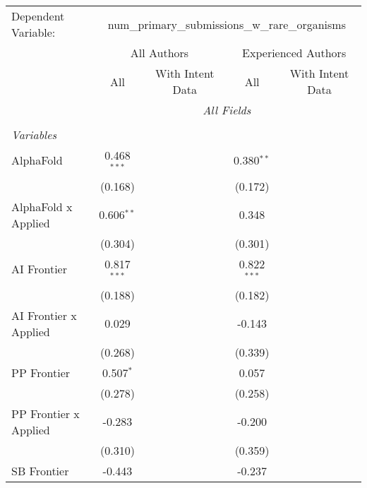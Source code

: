 \begingroup
\centering
\begin{tabular}{lcccccc}
   \tabularnewline \midrule \midrule
   Dependent Variable: & \multicolumn{6}{c}{num\_primary\_submissions\_w\_rare\_organisms}\\
 & \multicolumn{3}{c}{All Authors} & \multicolumn{3}{c}{Experienced Authors} \\
\cmidrule(lr){2-4} \cmidrule(lr){5-7}
 & \multicolumn{1}{c}{All} & \multicolumn{2}{c}{With Intent Data} & \multicolumn{1}{c}{All} & \multicolumn{2}{c}{With Intent Data} \\
\cmidrule(lr){2-2} \cmidrule(lr){3-4} \cmidrule(lr){5-5} \cmidrule(lr){6-7}
 & \multicolumn{6}{c}{\textit{All Fields}} \\ \\
   \emph{Variables}\\
   AlphaFold             & 0.468$^{***}$ &         &         & 0.380$^{**}$  &         &   \\   
                         & (0.168)       &         &         & (0.172)       &         &   \\   
   AlphaFold x Applied   & 0.606$^{**}$  &         &         & 0.348         &         &   \\   
                         & (0.304)       &         &         & (0.301)       &         &   \\   
   AI Frontier           & 0.817$^{***}$ &         &         & 0.822$^{***}$ &         &   \\   
                         & (0.188)       &         &         & (0.182)       &         &   \\   
   AI Frontier x Applied & 0.029         &         &         & -0.143        &         &   \\   
                         & (0.268)       &         &         & (0.339)       &         &   \\   
   PP Frontier           & 0.507$^{*}$   &         &         & 0.057         &         &   \\   
                         & (0.278)       &         &         & (0.258)       &         &   \\   
   PP Frontier x Applied & -0.283        &         &         & -0.200        &         &   \\   
                         & (0.310)       &         &         & (0.359)       &         &   \\   
   SB Frontier           & -0.443        &         &         & -0.237        &         &   \\   

\end{tabular}
